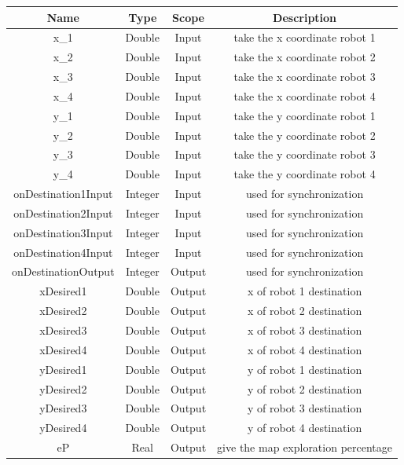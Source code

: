 \documentclass[english]{article}
\begin{document}
\begin{longtable}{|c|c|c|c|}
	\hline
	\textbf{Name} & 
	\textbf{Type} & 
	\textbf{Scope} &
	\textbf{Description} \\ \hline
	\endfirsthead
	\endhead
	x\_1 & Double & Input & take the x coordinate robot 1 \\ \hline
	x\_2 & Double & Input & take the x coordinate robot 2 \\ \hline
	x\_3 & Double & Input & take the x coordinate robot 3 \\ \hline
	x\_4 & Double & Input & take the x coordinate robot 4 \\ \hline
	y\_1 & Double & Input & take the y coordinate robot 1 \\ \hline
	y\_2 & Double & Input & take the y coordinate robot 2 \\ \hline
	y\_3 & Double & Input & take the y coordinate robot 3 \\ \hline
	y\_4 & Double & Input & take the y coordinate robot 4 \\ \hline
	onDestination1Input & Integer & Input & used for synchronization \\ \hline
	onDestination2Input & Integer & Input & used for synchronization \\ \hline
	onDestination3Input & Integer & Input & used for synchronization \\ \hline
	onDestination4Input & Integer & Input & used for synchronization \\ \hline
	onDestinationOutput & Integer & Output & used for synchronization \\ \hline
	xDesired1 & Double & Output & x of robot 1 destination\\ \hline
	xDesired2 & Double & Output & x of robot 2 destination\\ \hline
	xDesired3 & Double & Output & x of robot 3 destination\\ \hline
	xDesired4 & Double & Output & x of robot 4 destination\\ \hline
	yDesired1 & Double & Output & y of robot 1 destination\\ \hline
	yDesired2 & Double & Output & y of robot 2 destination\\ \hline
	yDesired3 & Double & Output & y of robot 3 destination\\ \hline
	yDesired4 & Double & Output & y of robot 4 destination\\ \hline
	eP & Real & Output & give the map exploration percentage\\ \hline

\end{longtable}
\end{document}
